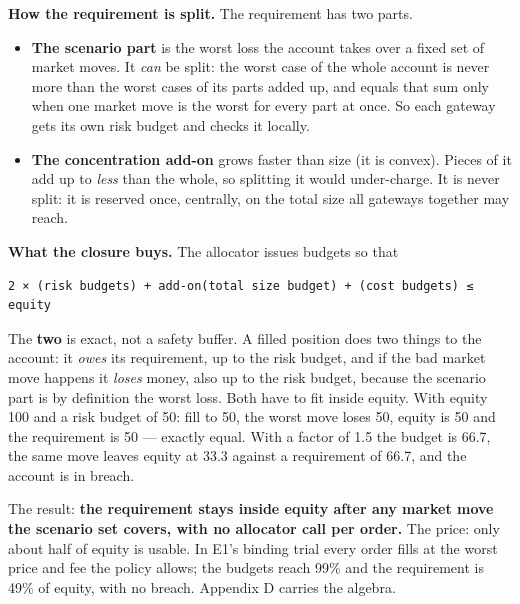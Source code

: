 \documentclass[10pt,a4paper]{article}
\providecommand{\tightlist}{\setlength{\itemsep}{0pt}\setlength{\parskip}{0pt}}
\begin{document}
\textbf{How the requirement is split.} The requirement has two parts.

\begin{itemize}
\tightlist
\item
  \textbf{The scenario part} is the worst loss the account takes over a fixed set of
  market moves. It \emph{can} be split: the worst case of the whole account is never
  more than the worst cases of its parts added up, and equals that sum only when
  one market move is the worst for every part at once. So each gateway gets its
  own risk budget and checks it locally.
\item
  \textbf{The concentration add-on} grows faster than size (it is convex). Pieces of
  it add up to \emph{less} than the whole, so splitting it would under-charge. It is
  never split: it is reserved once, centrally, on the total size all gateways
  together may reach.
\end{itemize}

\textbf{What the closure buys.} The allocator issues budgets so that

\begin{verbatim}
2 × (risk budgets) + add-on(total size budget) + (cost budgets) ≤ equity
\end{verbatim}

The \textbf{two} is exact, not a safety buffer. A filled position does two things to
the account: it \emph{owes} its requirement, up to the risk budget, and if the bad
market move happens it \emph{loses} money, also up to the risk budget, because the
scenario part is by definition the worst loss. Both have to fit inside equity.
With equity 100 and a risk budget of 50: fill to 50, the worst move loses 50,
equity is 50 and the requirement is 50 --- exactly equal. With a factor of 1.5 the
budget is 66.7, the same move leaves equity at 33.3 against a requirement of
66.7, and the account is in breach.

The result: \textbf{the requirement stays inside equity after any market move the
scenario set covers, with no allocator call per order.} The price: only about
half of equity is usable. In E1's binding trial every order fills at the worst
price and fee the policy allows; the budgets reach 99\% and the requirement is
49\% of equity, with no breach. Appendix D carries the algebra.
\end{document}
